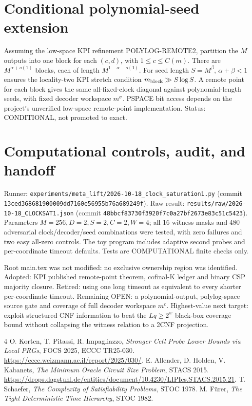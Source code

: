 \documentclass[11pt]{article}
\begin{document}
\section{Conditional polynomial-seed extension}
Assuming the low-space KPI refinement POLYLOG-REMOTE2,
partition the \(M\) outputs into one block for each
\((c,d)\), with \(1\le c\le C(m)\).
There are \(M^{\alpha+o(1)}\) blocks, each of length
\(M^{1-\alpha-o(1)}\).
For seed length \(S=M^\beta\), \(\alpha+\beta<1\)
ensures the locality-two KPI stretch condition
\(m_{\rm block}\gg S\log S\).
A remote point for each block gives the same
all-fixed-clock diagonal against polynomial-length
seeds, with fixed decoder workspace \(m^\sigma\).
PSPACE bit access depends on the project's
unverified low-space remote-point implementation.
Status: CONDITIONAL, not promoted to exact.

\section{Computational controls, audit, and handoff}
Runner:
\texttt{experiments/meta\_lift/2026-10-18\_clock\_saturation1.py}
(commit \texttt{13ced368681900009dd7160e56955b76a689249f}).
Raw result:
\texttt{results/raw/2026-10-18\_CLOCKSAT1.json}
(commit \texttt{48bbcf83730f3920f7c0a27bf2673e83c51c5423}).
Parameters \(M=256,D=2,S=2,C=2,W=4\);
all 16 witness masks and 480 adversarial
clock/decoder/seed combinations were tested,
with zero failures and two easy all-zero controls.
The toy program includes adaptive second probes
and per-coordinate timeout defaults. Tests are
COMPUTATIONAL finite checks only.

Root main.tex was not modified: no exclusive ownership
region was identified.
Adopted: KPI published remote-point theorem,
cofinal-K ledger and binary CSP majority closure.
Retired: using one long timeout as equivalent to
every shorter per-coordinate timeout.
Remaining OPEN: a polynomial-output,
polylog-space source gate and coverage of full
decoder workspace \(m^c\).
Highest-value next target: exploit structured CNF
information to beat the \(Lq\ge2^w\) black-box
coverage bound without collapsing the witness
relation to a 2CNF projection.

\begin{thebibliography}{4}
 O. Korten, T. Pitassi, R. Impagliazzo,
\emph{Stronger Cell Probe Lower Bounds via Local PRGs},
FOCS 2025, ECCC TR25-030.
\url{https://eccc.weizmann.ac.il/report/2025/030/}.
 E. Allender, D. Holden, V. Kabanets,
\emph{The Minimum Oracle Circuit Size Problem},
STACS 2015.
\url{https://drops.dagstuhl.de/entities/document/10.4230/LIPIcs.STACS.2015.21}.
 T. Schaefer,
\emph{The Complexity of Satisfiability Problems},
STOC 1978.
 M. F\"urer,
\emph{The Tight Deterministic Time Hierarchy},
STOC 1982.
\end{thebibliography}
\end{document}
